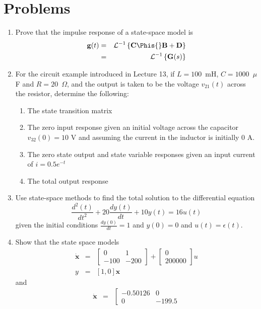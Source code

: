\section*{Problems}
\begin{enumerate}
\item Prove that the impulse response of a state-space model is
\begin{eqnarray*}
\mathbf{g}(t)&=&\mathcal{L}^{-1}\left\{\mathbf{C}\Phis{}\mathbf{B}+\mathbf{D}\right\}\\
&=&\mathcal{L}^{-1}\left\{\mathbf{G}(s)\right\}
\end{eqnarray*}
\item \label{l4q1}
For the circuit example introduced in Lecture 13, if $L=100$~mH,
$C=1000$~$\mu$F and $R=20$~$\Omega$, and the output is taken to be
the voltage $v_{21}(t)$ across the resistor, determine the
following:
\begin{enumerate}
\item The state transition matrix
\item The zero input response given an initial voltage across the
capacitor $v_{32}(0)=10$ V and assuming the current in the
inductor is initially $0$ A.
\item The zero state output and state variable responses given an input current of
$i=0.5e^{-t}$ \item The total output response
\end{enumerate}
\item Use state-space methods to find the total solution to the
differential equation
$$\frac{d^2(t)}{dt^2}+20\frac{dy(t)}{dt}+10y(t) = 16u(t)$$ given
the initial conditions $\frac{dy(0)}{dt}=1$ and $y(0)=0$ and
$u(t)=\epsilon(t)$.
\item Show that the state space models
\begin{eqnarray*}\dot{\mathbf{x}}&=&\left[\begin{array}{cc}
  0 & 1 \\
  -100 & -200
\end{array}\right]+\left[\begin{array}{c}
  0 \\
  200000
\end{array}\right]u\\ y&=&[1, 0]\mathbf{x}
\end{eqnarray*} and \begin{eqnarray*}\dot{\mathbf{x}}&=&\left[\begin{array}{cc}
  -0.50126 & 0 \\
  0 & -199.5

\end{array}
\end{eqnarray*}
\end{enumerate}

